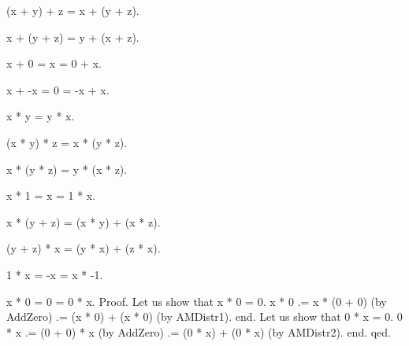 \documentclass[a4paper,draft]{amsproc}
\begin{document}
\begin{ftlaxiom}[AddAsso]
(x + y) + z = x + (y + z).
\end{ftlaxiom}

\begin{ftlaxiom}[AddBubble]
x + (y + z) = y + (x + z).
\end{ftlaxiom}

\begin{ftlaxiom}[AddZero]
x + 0 = x = 0 + x.
\end{ftlaxiom}

\begin{ftlaxiom}[AddInvr]
x + -x = 0 = -x + x.
\end{ftlaxiom}

\begin{ftlaxiom}[MulComm]
x * y = y * x.
\end{ftlaxiom}

\begin{ftlaxiom}[MulAsso]
(x * y) * z = x * (y * z).
\end{ftlaxiom}

\begin{ftlaxiom}[MulBubble]
x * (y * z) = y * (x * z).
\end{ftlaxiom}

\begin{ftlaxiom}[MulUnit]
x * 1 = x = 1 * x.
\end{ftlaxiom}

\begin{ftlaxiom}[AMDistr1]
x * (y + z) = (x * y) + (x * z).
\end{ftlaxiom}

\begin{ftlaxiom}[AMDistr2]
(y + z) * x = (y * x) + (z * x).
\end{ftlaxiom}

\begin{ftlaxiom}[MulMnOne]
1 * x = -x = x * -1.
\end{ftlaxiom}

\begin{ftllemma}[MulZero]
x * 0 = 0 = 0 * x.
Proof.
    Let us show that x * 0 = 0.
    x * 0 .= x * (0 + 0) (by AddZero) .= (x * 0) + (x * 0) (by AMDistr1).
    end.
    Let us show that 0 * x = 0.
    0 * x .= (0 + 0) * x (by AddZero) .= (0 * x) + (0 * x) (by AMDistr2).
    end.
qed.
\end{ftllemma}
\end{document}
